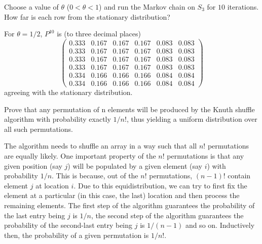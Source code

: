 \documentclass[12pt]{article}
\begin{document}
\begin{exercise}
    Choose a value of \( \theta \) (\( 0 < \theta < 1 \)) and run the
    Markov chain on \( S_3 \) for \( 10 \) iterations.  How far is each
    row from the stationary distribution?
\end{exercise}
\begin{solution}
    For \( \theta = 1/2 \), \( P^{10} \) is (to three decimal places)
    \[
        \begin{pmatrix}
            0.333&0.167&0.167&0.167&0.083&0.083\\
            0.333&0.167&0.167&0.167&0.083&0.083\\
            0.333&0.167&0.167&0.167&0.083&0.083\\
            0.333&0.167&0.167&0.167&0.083&0.083\\
            0.334&0.166&0.166&0.166&0.084&0.084\\
            0.334&0.166&0.166&0.166&0.084&0.084
        \end{pmatrix}
    \] agreeing with the stationary distribution.
\end{solution}

\begin{exercise}
    Prove that any permutation of n elements will be produced by the
    Knuth shuffle algorithm with probability exactly \( 1/n! \), thus
    yielding a uniform distribution over all such permutations.

\end{exercise}
\begin{solution}
    The algorithm needs to shuffle an array in a way such that all \( n!
    \) permutations are equally likely.  One important property of the \(
    n! \) permutations is that any given position (say \( j \)) will be
    populated by a given element (say \( i \)) with probability \( 1/n \).
    This is because, out of the \( n! \) permutations, \( (n-1)! \)
    contain element \( j \) at location \( i \).  Due to this
    equidistribution, we can try to first fix the element at a
    particular (in this case, the last) location and then process the
    remaining elements.  The first step of the algorithm guarantees the
    probability of the last entry being \( j \) is \( 1/n \), the second
    step of the algorithm guarantees the probability of the second-last
    entry being \( j \) is \( 1/(n-1) \) and so on. Inductively then,
    the probability of a given permutation is \( 1/n! \).
\end{solution}
\end{document}
